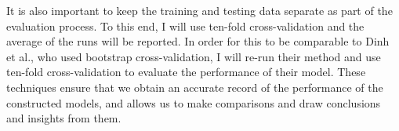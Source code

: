 \documentclass[a4paper]{article}
\begin{document}
It is also important to keep the training and testing data separate as part
of the evaluation process. To this end, I will use ten-fold cross-validation
and the average of the runs will be reported. In order for this to be
comparable to Dinh et al.\citep{Dinh2013a}, who used bootstrap
cross-validation, I will re-run their method and use ten-fold cross-validation
to evaluate the performance of their model. These techniques ensure that we
obtain an accurate record of the performance of the constructed models, and
allows us to make comparisons and draw conclusions and insights from them.



\end{document}
